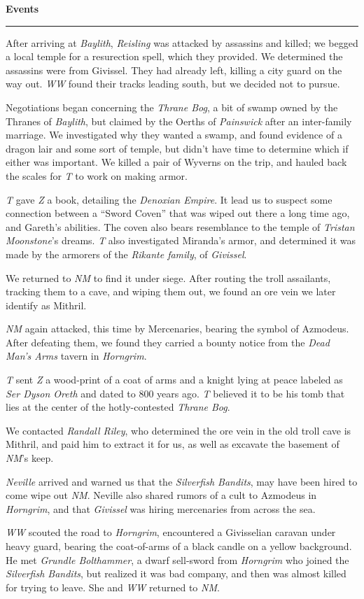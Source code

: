 \documentclass[letterpaper]{article}
\newcommand{\e}[1]{\emph{#1}}
\newcommand{\B}[1]{\textbf{#1}}
\newenvironment{notesection}[1]
{ {\huge \B{#1}}\hrule\vspace{0.5em}\begingroup\fontsize{9pt}{12pt}\selectfont}
{\endgroup}
\begin{document}
\begin{notesection}{Events}
After arriving at \e{Baylith}, \e{Reisling} was attacked by assassins and killed; we begged a local temple for a resurection spell, which they provided. We determined the assassins were from Givissel. They had already left, killing a city guard on the way out.  \e{WW} found their tracks leading south, but we decided not to pursue.

Negotiations began concerning the \e{Thrane Bog}, a bit of swamp owned by the Thranes of \e{Baylith}, but claimed by the Oerths of \e{Painswick} after an inter-family marriage.  We investigated why they wanted a swamp, and found evidence of a dragon lair and some sort of temple, but didn't have time to determine which if either was important.  We killed a pair of Wyverns on the trip, and hauled back the scales for \e{T} to work on making armor.

\e{T} gave \e{Z} a book, detailing the \e{Denoxian Empire}. It lead us to suspect some connection between a ``Sword Coven'' that was wiped out there a long time ago, and Gareth's abilities. The coven also bears resemblance to the temple of \e{Tristan Moonstone}'s dreams. \e{T} also investigated Miranda's armor, and determined it was made by the armorers of the \e{Rikante family}, of \e{Givissel}.

We returned to \e{NM} to find it under siege. After routing the troll assailants, tracking them to a cave, and wiping them out, we found an ore vein we later identify as Mithril.

\e{NM} again attacked, this time by Mercenaries, bearing the symbol of Azmodeus.  After defeating them, we found they carried a bounty notice from the \e{Dead Man's Arms} tavern in \e{Horngrim}.

\e{T} sent \e{Z} a wood-print of a coat of arms and a knight lying at peace labeled as \e{Ser Dyson Oreth} and dated to 800 years ago.  \e{T} believed it to be his tomb that lies at the center of the hotly-contested \e{Thrane Bog}.

We contacted \e{Randall Riley}, who determined the ore vein in the old troll cave is Mithril, and paid him to extract it for us, as well as excavate the basement of \e{NM}'s keep.

\e{Neville} arrived and warned us that the \e{Silverfish Bandits}, may have been hired to come wipe out \e{NM}.  Neville also shared rumors of a cult to Azmodeus in \e{Horngrim}, and that \e{Givissel} was hiring mercenaries from across the sea.

\e{WW} scouted the road to \e{Horngrim}, encountered a Givisselian caravan under heavy guard, bearing the coat-of-arms of a black candle on a yellow background.  He met \e{Grundle Bolthammer}, a dwarf sell-sword from \e{Horngrim} who joined the \e{Silverfish Bandits}, but realized it was bad company, and then was almost killed for trying to leave. She and \e{WW} returned to \e{NM}.


\end{notesection}
\end{document}
